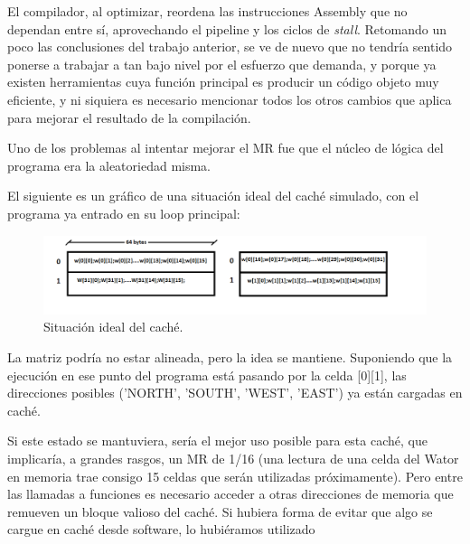 \documentclass[a4paper,10pt]{article}
\begin{document}
    El compilador, al optimizar, reordena las instrucciones Assembly que no dependan entre s\'i, aprovechando el pipeline y los ciclos de \textit{stall}. Retomando un poco las conclusiones del trabajo anterior, se ve de nuevo que no tendr\'ia sentido ponerse a trabajar a tan bajo nivel por el esfuerzo que demanda, y porque ya existen herramientas cuya funci\'on principal es producir un c\'odigo objeto muy eficiente, y ni siquiera es necesario mencionar todos los otros cambios que aplica para mejorar el resultado de la compilaci\'on.

    Uno de los problemas al intentar mejorar el MR fue que el n\'ucleo de l\'ogica del programa era la aleatoriedad misma.

El siguiente es un gr\'afico de una situaci\'on ideal del cach\'e simulado, con el programa ya entrado en su loop principal:

\begin{figure}[!htp]
\begin{center}
\includegraphics[width=1\textwidth]{Cache.png}
\end{center}
\caption{Situaci\'on ideal del cach\'e.} \label{fig001234}
\end{figure}

La matriz podr\'ia no estar alineada, pero la idea se mantiene. Suponiendo que la ejecuci\'on en ese punto del programa est\'a pasando por la celda [0][1], las direcciones posibles ('NORTH', 'SOUTH', 'WEST', 'EAST') ya est\'an cargadas en cach\'e.

Si este estado se mantuviera, ser\'ia el mejor uso posible para esta cach\'e, que implicar\'ia, a grandes rasgos, un MR de 1/16 (una lectura de una celda del Wator en memoria trae consigo 15 celdas que ser\'an utilizadas pr\'oximamente). Pero entre las llamadas a funciones es necesario acceder a otras direcciones de memoria que remueven un bloque valioso del cach\'e. Si hubiera forma de evitar que algo se cargue en cach\'e desde software, lo hubi\'eramos utilizado
    
\end{document}
